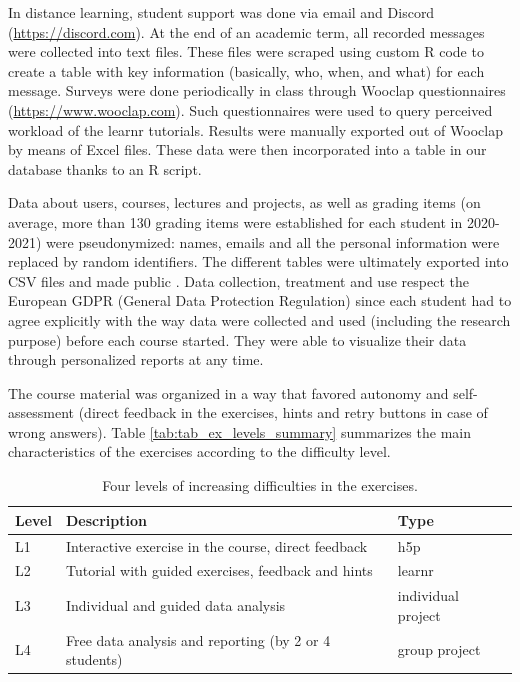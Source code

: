 \documentclass{aims}
\theoremstyle{definition}
\begin{document}
In distance learning, student support was done via email and Discord
(\url{https://discord.com}). At the end of an academic term, all
recorded messages were collected into text files. These files were
scraped using custom R code to create a table with key information
(basically, who, when, and what) for each message. Surveys were done
periodically in class through Wooclap questionnaires
(\url{https://www.wooclap.com}). Such questionnaires were used to query
perceived workload of the learnr tutorials. Results were manually
exported out of Wooclap by means of Excel files. These data were then
incorporated into a table in our database thanks to an R script.

Data about users, courses, lectures and projects, as well as grading
items (on average, more than 130 grading items were established for each
student in 2020-2021) were pseudonymized: names, emails and all the
personal information were replaced by random identifiers. The different
tables were ultimately exported into CSV files and made public
\cite{Grosjeandataset2020}. Data collection, treatment and use respect
the European GDPR (General Data Protection Regulation) since each
student had to agree explicitly with the way data were collected and
used (including the research purpose) before each course started. They
were able to visualize their data through personalized reports at any
time.

The course material was organized in a way that favored autonomy and
self-assessment (direct feedback in the exercises, hints and retry
buttons in case of wrong answers). Table
\ref {tab:tab_ex_levels_summary} summarizes the main characteristics of
the exercises according to the difficulty level.

\begin{table}

\caption{\label{tab:tab_ex_levels_summary}\label{tab:tab_ex_levels} Four levels of increasing difficulties in the exercises.}
\centering
\begin{tabular}[t]{l|l|l}
\hline
Level & Description & Type\\
\hline
L1 & Interactive exercise in the course, direct feedback & h5p\\
\hline
L2 & Tutorial with guided exercises, feedback and hints & learnr\\
\hline
L3 & Individual and guided data analysis & individual project\\
\hline
L4 & Free data analysis and reporting (by 2 or 4 students) & group project\\
\hline
\end{tabular}
\end{table}
\end{document}
